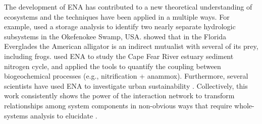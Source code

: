\documentclass[11pt]{article}
\begin{document}
\begin{spacing}{2}
The development of ENA has contributed to a new theoretical
understanding of ecosystems \citep{ulanowicz86, higashi91, belgrano05,
  jorgensen07_newecology} and the techniques have been applied in a
multiple ways.  For example, \citet{patten82} used a storage analysis
to identify two nearly separate hydrologic subsystems in the
Okefenokee Swamp, USA.  \citet{bondavalli99} showed that in the
Florida Everglades the American alligator is an indirect mutualist
with several of its prey, including frogs.  \citet{hines12} used
ENA to study the Cape Fear River estuary sediment nitrogen cycle, and applied
the tools to quantify the coupling between biogeochemical processes
(e.g., nitrification + anammox).  
Furthermore, several scientists have used ENA to investigate urban
sustainability \citep{bodini02, zhang10_ecomod, chen12,
  bodini2012cities}.  Collectively, this work consistently shows the
power of the interaction network to transform relationships among
system components in non-obvious ways that require whole-systems
analysis to elucidate \citep{ulanowicz90, patten91,
  fath07_netconstruction}.


\end{spacing}
\end{document}
